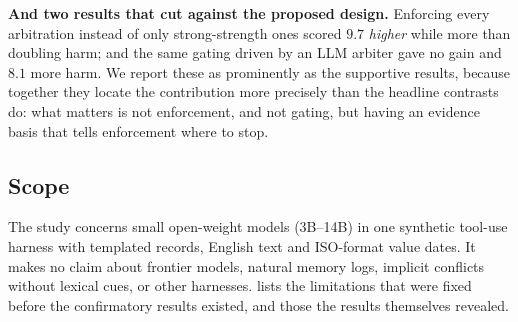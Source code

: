 \textbf{And two results that cut against the proposed design.} Enforcing every arbitration instead of only
strong-strength ones scored $9.7$\pp{} \emph{higher} while more than doubling harm; and the same gating driven by an
LLM arbiter gave no gain and $8.1$\pp{} more harm. We report these as prominently as the supportive results, because
together they locate the contribution more precisely than the headline contrasts do: what matters is not
enforcement, and not gating, but having an evidence basis that tells enforcement where to stop.

\subsection{Scope}

The study concerns small open-weight models (3B--14B) in one synthetic tool-use harness with templated records,
English text and ISO-format value dates. It makes no claim about frontier models, natural memory logs, implicit
conflicts without lexical cues, or other harnesses.  lists the limitations that were fixed
before the confirmatory results existed, and those the results themselves revealed.
